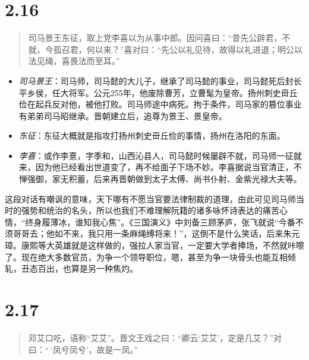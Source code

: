 \documentclass[]{book}
\providecommand{\tightlist}{%
  \setlength{\itemsep}{0pt}\setlength{\parskip}{0pt}}
\begin{document}
\section{2.16}\label{section-62}

\begin{quote}
司马景王东征，取上党李喜以为从事中郎。因问喜曰：``昔先公辟君，不就，今孤召君，何以来？''喜对曰：``先公以礼见待，故得以礼进退；明公以法见绳，喜畏法而至耳。''
\end{quote}

\begin{itemize}
\tightlist
\item
  \emph{司马景王}：司马师，司马懿的大儿子，继承了司马懿的事业，司马懿死后封长平乡侯，任大将军。公元255年，他废除曹芳，立曹髦为皇帝。扬州刺史毌丘俭在起兵反对他，被他打败。司马师途中病死。拘于条件，司马家的篡位事业有弟弟司马昭继承。晋朝建立后，追尊为景王、景皇帝。
\item
  \emph{东征}：东征大概就是指攻打扬州刺史毌丘俭的事情，扬州在洛阳的东面。
\item
  \emph{李喜}：或作李憙，字季和，山西沁县人，司马懿时候屡辟不就，司马师一征就来，因为他已经看出世道变了，再不给面子下场不妙。李喜据说当官清正，不惮强御，家无积蓄，后来再晋朝做到太子太傅、尚书仆射、金紫光禄大夫等。
\end{itemize}

这段对话有嘲讽的意味，天下哪有不愿当官要法律制裁的道理，由此可见司马师当时的强势和统治的名头，所以也我们不难理解阮籍的诸多咏怀诗表达的痛苦心情，``终身履薄冰，谁知我心焦''。《三国演义》中刘备三顾茅庐，张飞就说``今番不须哥哥去；他如不来，我只用一条麻绳缚将来！''，这倒不是什么笑话，后来朱元璋。康熙等大英雄就是这样做的，强拉人家当官，一定要大学者捧场，不然就咔嚓了。现在绝大多数官员，为争一个领导职位，嗯，甚至为争一块骨头也能互相倾轧，丑态百出，也算是另一种焦灼。

\section{2.17}\label{section-63}

\begin{quote}
邓艾口吃，语称``艾艾''。晋文王戏之曰：``卿云`艾艾'，定是几艾？''对曰：``\,`凤兮凤兮'，故是一凤。''
\end{quote}
\end{document}
